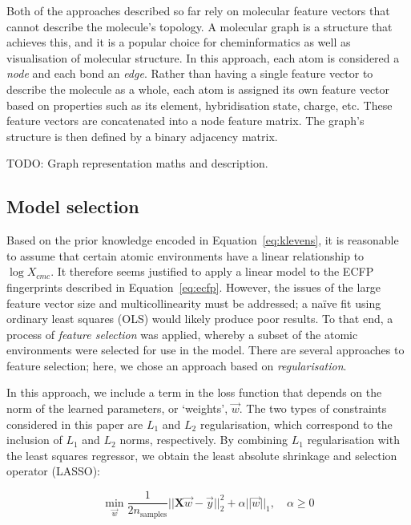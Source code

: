 Both of the approaches described so far rely on molecular feature vectors that
cannot describe the molecule's topology. A molecular graph is a structure that
achieves this, and it is a popular choice for cheminformatics as well as
visualisation of molecular structure. In this approach, each atom is considered
a \emph{node} and each bond an \emph{edge}. Rather than having a single feature
vector to describe the molecule as a whole, each atom is assigned its own
feature vector based on properties such as its element, hybridisation state,
charge, etc. These feature vectors are concatenated into a node feature matrix.
The graph's structure is then defined by a binary adjacency matrix.

TODO: Graph representation maths and description.

\subsection{Model selection}

Based on the prior knowledge encoded in Equation~\ref{eq:klevens}, it is
reasonable to assume that certain atomic environments have a linear relationship
to $\log X_{cmc}$. It therefore seems justified to apply a linear model to the
ECFP fingerprints described in Equation~\ref{eq:ecfp}. However, the issues of
the large feature vector size and multicollinearity must be addressed; a na\"ive
fit using ordinary least squares (OLS) would likely produce poor results. To
that end, a process of \emph{feature selection} was applied, whereby a subset of
the atomic environments were selected for use in the model. There are several
approaches to feature selection\cite{liFeatureSelectionData2017}; here, we chose
an approach based on \emph{regularisation}.

In this approach, we include a term in the loss function that depends on the
norm of the learned parameters, or `weights', $\vec{w}$. The two types of constraints
considered in this paper are $L_1$ and $L_2$ regularisation, which correspond to
the inclusion of $L_1$ and $L_2$ norms, respectively. By combining $L_1$
regularisation with the least squares regressor, we obtain the least absolute
shrinkage and selection operator (LASSO)\cite{tibshiraniRegressionShrinkageSelection1996}:

\begin{equation}
    \min_{\vec{w}} { \frac{1}{2n_{\text{samples}}} ||\mathbf{X}\vec{w} - \vec{y}||_2 ^ 2 + \alpha ||\vec{w}||_1},\quad \alpha \geq 0
\end{equation}

